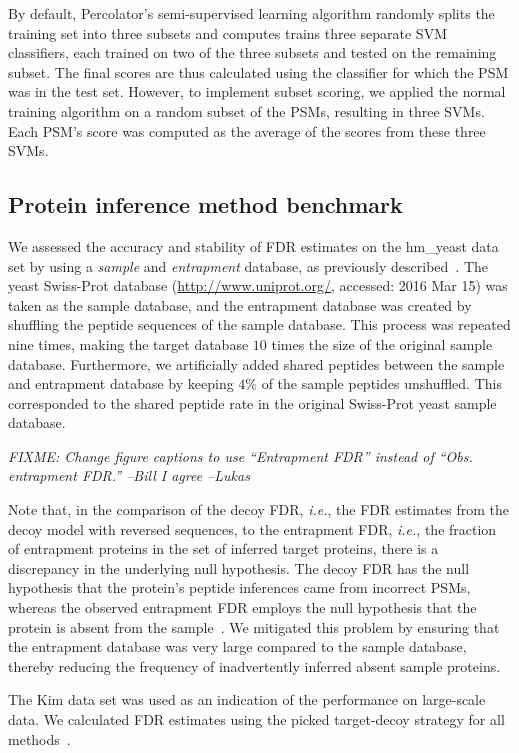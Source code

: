 \documentclass{article}
\begin{document}
By default, Percolator's semi-supervised learning algorithm randomly
splits the training set into three subsets and computes trains three
separate SVM classifiers, each trained on two of the three subsets and
tested on the remaining subset.  The final scores are thus calculated
using the classifier for which the PSM was in the test set. However,
to implement subset scoring, we applied the normal training algorithm
on a random subset of the PSMs, resulting in three SVMs.  Each PSM's
score was computed as the average of the scores from these three SVMs.

\subsection*{Protein inference method benchmark}

We assessed the accuracy and stability of FDR estimates on the
hm\_yeast data set by using a {\em sample} and {\em entrapment}
database, as previously described~\cite{granholm2013determining}. The
yeast Swiss-Prot database (\url{http://www.uniprot.org/}, accessed:
2016 Mar 15) was taken as the sample database, and the entrapment
database was created by shuffling the peptide sequences of the sample
database. This process was repeated nine times, making the target
database $10$ times the size of the original sample database.
Furthermore, we artificially added shared peptides between the sample
and entrapment database by keeping $4\%$ of the sample peptides
unshuffled. This corresponded to the shared peptide rate in the
original Swiss-Prot yeast sample database.

{\em FIXME: Change figure captions to use ``Entrapment FDR'' instead
of
  ``Obs. entrapment FDR.'' --Bill I agree --Lukas}

Note that, in the comparison of the decoy FDR, {\em i.e.}, the FDR
estimates from the decoy model with reversed sequences, to the
entrapment FDR, {\em i.e.}, the fraction of entrapment proteins in the
set of inferred target proteins, there is a discrepancy in the
underlying null hypothesis. The decoy FDR has the null hypothesis that
the protein's peptide inferences came from incorrect PSMs, whereas the
observed entrapment FDR employs the null hypothesis that the protein
is absent from the sample~\cite{the:how}. We mitigated this problem by
ensuring that the entrapment database was very large compared to the
sample database, thereby reducing the frequency of inadvertently
inferred absent sample proteins.

The Kim data set was used as an indication of the performance on
large-scale data. We calculated FDR estimates
using the picked target-decoy strategy for all
methods~\cite{savitski2015scalable}.
\end{document}
